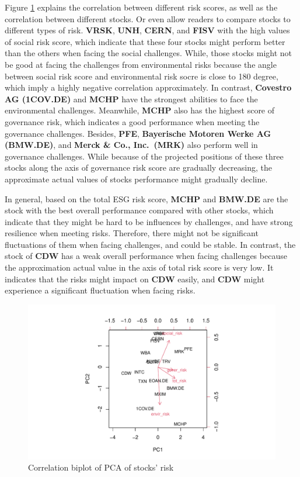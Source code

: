 \documentclass[11pt,a4paper,]{article}
\begin{document}
Figure \ref{fig:pca-risk-correlation} explains the correlation between different risk scores, as well as the correlation between different stocks. Or even allow readers to compare stocks to different types of risk. \textbf{VRSK}, \textbf{UNH}, \textbf{CERN}, and \textbf{FISV} with the high values of social risk score, which indicate that these four stocks might perform better than the others when facing the social challenges. While, those stocks might not be good at facing the challenges from environmental risks because the angle between social risk score and environmental risk socre is close to 180 degree, which imply a highly negative correlation approximately. In contrast, \textbf{Covestro AG (1COV.DE)} and \textbf{MCHP} have the strongest abilities to face the environmental challenges. Meanwhile, \textbf{MCHP} also has the highest score of governance risk, which indicates a good performance when meeting the governance challenges. Besides, \textbf{PFE}, \textbf{Bayerische Motoren Werke AG (BMW.DE)}, and \textbf{Merck \& Co., Inc.~(MRK)} also perform well in governance challenges. While because of the projected positions of these three stocks along the axis of governance risk score are gradually decreasing, the approximate actual values of stocks performance might gradually decline.

In general, based on the total ESG risk score, \textbf{MCHP} and \textbf{BMW.DE} are the stock with the best overall performance compared with other stocks, which indicate that they might be hard to be influences by challenges, and have strong resilience when meeting risks. Therefore, there might not be significant fluctuations of them when facing challenges, and could be stable. In contrast, the stock of \textbf{CDW} has a weak overall performance when facing challenges because the approximation actual value in the axis of total risk score is very low. It indicates that the risks might impact on \textbf{CDW} easily, and \textbf{CDW} might experience a significant fluctuation when facing risks.

\begin{figure}
\centering
\includegraphics{ass2_files/figure-latex/pca-risk-correlation-1.pdf}
\caption{\label{fig:pca-risk-correlation}Correlation biplot of PCA of stocks' risk}
\end{figure}
\end{document}
